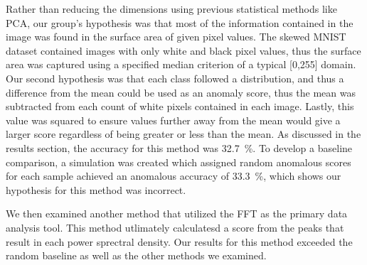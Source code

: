 Rather than reducing the dimensions using previous statistical methods like PCA, our group’s hypothesis
was that most of the information contained in the image was found in the surface area of given pixel
values. The skewed MNIST dataset contained images with only white and black pixel values, thus the
surface area was captured using a specified median criterion of a typical [0,255] domain.
Our second hypothesis was that each class followed a distribution, and thus a difference from the mean
could be used as an anomaly score, thus the mean was subtracted from each count of white pixels
contained in each image. Lastly, this value was squared to ensure values further away from the mean
would give a larger score regardless of being greater or less than the mean.
As discussed in the results section, the accuracy for this method was 32.7~\%. To develop a baseline
comparison, a simulation was created which assigned random anomalous scores for each sample
achieved an anomalous accuracy of 33.3~\%, which shows our hypothesis for this method was incorrect. 

We then examined another method that utilized the FFT as the primary data analysis tool. This method utlimately calculatesd a score from the peaks that result in each power sprectral density.
Our results for this method exceeded the random baseline as well as the other methods we examined.